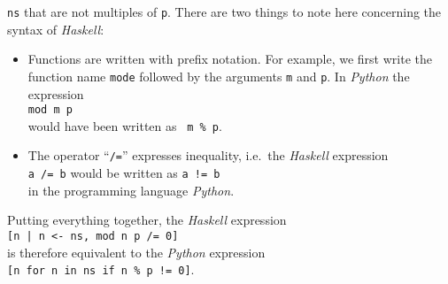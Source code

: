 \documentclass[11pt]{report}
\begin{document}
\begin{enumerate}[(a)]
\begin{enumerate}[1.]
    \texttt{ns} that are not multiples of \texttt{p}.  There are two things to note here concerning the syntax
    of \textsl{Haskell}:
    \begin{itemize}
    \item Functions are written with prefix notation.  For example, we first write the function name
      \texttt{mode} followed by the arguments \texttt{m} and \texttt{p}.  In \textsl{Python} the expression
      \\[0.2cm]
      \hspace*{1.3cm}
      \texttt{mod m p}
      \\[0.2cm]
      would have been written as \ \texttt{m \% p}.
    \item The operator ``\texttt{/=}'' expresses inequality, i.e.~the \textsl{Haskell} expression
      \\[0.2cm]
      \hspace*{1.3cm}
      \texttt{a /= b} \qquad would be written as \qquad \texttt{a != b} 
      \\[0.2cm]
      in the programming language \textsl{Python}.
    \end{itemize}
    Putting everything together, the \textsl{Haskell} expression 
    \\[0.2cm]
    \hspace*{1.3cm}
    \texttt{[n | n <- ns, mod n p /= 0]}
    \\[0.2cm]
    is therefore equivalent to the \textsl{Python} expression
    \\[0.2cm]
    \hspace*{1.3cm}
    \texttt{[n for n in ns if n \% p != 0]}.
  \end{enumerate}
\end{enumerate}




\end{document}
